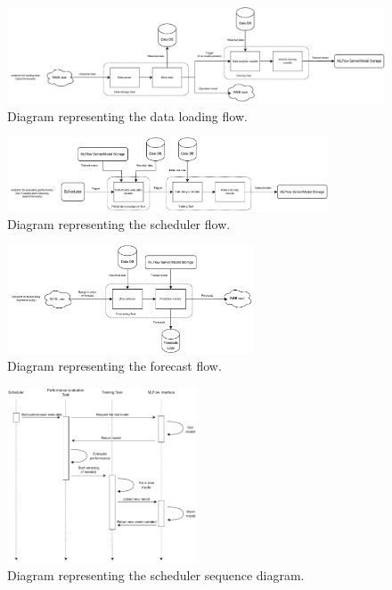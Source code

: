 \begin{figure}[H]
\centering 
\includegraphics[width=1\textwidth]{images/architecture_data_loading_flow} 
\caption{Diagram representing the data loading flow.}
\label{fig:loadingflow}
\end{figure}

\begin{figure}[H]
\centering 
\includegraphics[width=0.85\textwidth]{images/architecture_scheduler_flow} 
\caption{Diagram representing the scheduler flow.}
\label{fig:schedulerflow}
\end{figure}

\begin{figure}[H]
\centering 
\includegraphics[width=0.65\textwidth]{images/architecture_forecast_flow} 
\caption{Diagram representing the forecast flow.}
\label{fig:forecastflow}
\end{figure}

\begin{figure}[H]
\centering 
\includegraphics[width=0.5\textwidth]{images/architecture_scheduler_sequence} 
\caption{Diagram representing the scheduler sequence diagram.}
\label{fig:schedulersequence}
\end{figure}

